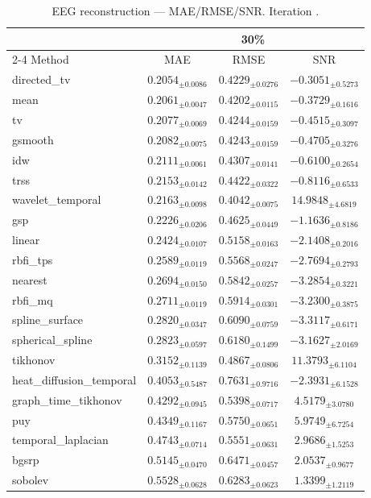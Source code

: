 ﻿%
\begin{table}[ht]
\centering
\caption[EEG reconstruction - Iteration it33]{EEG reconstruction — MAE/RMSE/SNR. Iteration .}
\label{tab:main_it33_3syn_mr30_only}
\small
\begin{tabular}{lccc}
\toprule
\multicolumn{1}{c}{} & \multicolumn{3}{c}{30\%} \\
\cmidrule(lr){2-4}
Method & MAE & RMSE & SNR \\
\midrule
directed\_tv & $0.2054_{\pm 0.0086}$ & $0.4229_{\pm 0.0276}$ & $-0.3051_{\pm 0.5273}$ \\
mean & $0.2061_{\pm 0.0047}$ & $0.4202_{\pm 0.0115}$ & $-0.3729_{\pm 0.1616}$ \\
tv & $0.2077_{\pm 0.0069}$ & $0.4244_{\pm 0.0159}$ & $-0.4515_{\pm 0.3097}$ \\
gsmooth & $0.2082_{\pm 0.0075}$ & $0.4243_{\pm 0.0159}$ & $-0.4705_{\pm 0.3276}$ \\
idw & $0.2111_{\pm 0.0061}$ & $0.4307_{\pm 0.0141}$ & $-0.6100_{\pm 0.2654}$ \\
trss & $0.2153_{\pm 0.0142}$ & $0.4422_{\pm 0.0322}$ & $-0.8116_{\pm 0.6533}$ \\
wavelet\_temporal & $0.2163_{\pm 0.0098}$ & $0.4042_{\pm 0.0075}$ & $14.9848_{\pm 4.6819}$ \\
gsp & $0.2226_{\pm 0.0206}$ & $0.4625_{\pm 0.0449}$ & $-1.1636_{\pm 0.8186}$ \\
linear & $0.2424_{\pm 0.0107}$ & $0.5158_{\pm 0.0163}$ & $-2.1408_{\pm 0.2016}$ \\
rbfi\_tps & $0.2589_{\pm 0.0119}$ & $0.5568_{\pm 0.0247}$ & $-2.7694_{\pm 0.2793}$ \\
nearest & $0.2694_{\pm 0.0150}$ & $0.5842_{\pm 0.0257}$ & $-3.2854_{\pm 0.3221}$ \\
rbfi\_mq & $0.2711_{\pm 0.0119}$ & $0.5914_{\pm 0.0301}$ & $-3.2300_{\pm 0.3875}$ \\
spline\_surface & $0.2820_{\pm 0.0347}$ & $0.6090_{\pm 0.0759}$ & $-3.3117_{\pm 0.6171}$ \\
spherical\_spline & $0.2823_{\pm 0.0597}$ & $0.6180_{\pm 0.1499}$ & $-3.1627_{\pm 2.0169}$ \\
tikhonov & $0.3152_{\pm 0.1139}$ & $0.4867_{\pm 0.0806}$ & $11.3793_{\pm 6.1104}$ \\
heat\_diffusion\_temporal & $0.4053_{\pm 0.5487}$ & $0.7631_{\pm 0.9716}$ & $-2.3931_{\pm 6.1528}$ \\
graph\_time\_tikhonov & $0.4292_{\pm 0.0945}$ & $0.5398_{\pm 0.0717}$ & $4.5179_{\pm 3.0780}$ \\
puy & $0.4349_{\pm 0.1167}$ & $0.5750_{\pm 0.0651}$ & $5.9749_{\pm 6.7254}$ \\
temporal\_laplacian & $0.4743_{\pm 0.0714}$ & $0.5551_{\pm 0.0631}$ & $2.9686_{\pm 1.5253}$ \\
bgsrp & $0.5145_{\pm 0.0470}$ & $0.6471_{\pm 0.0457}$ & $2.0537_{\pm 0.9677}$ \\
sobolev & $0.5528_{\pm 0.0628}$ & $0.6283_{\pm 0.0623}$ & $1.3399_{\pm 1.2119}$ \\
\bottomrule
\end{tabular}
\end{table}







